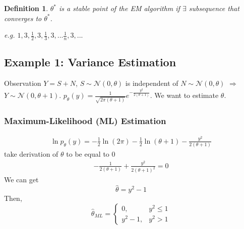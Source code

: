 \documentclass[11pt,a4paper]{article}
\newtheorem{definition}{Definition}
\begin{document}
\begin{definition}
    $\theta^*$ is a stable point of the EM algorithm if $\exists$ subsequence that converges to $\theta^*$.

    e.g. $1,3,\frac{1}{2},3,\frac{1}{3},3,...\frac{1}{n},3,...$
\end{definition}

\subsection{Example 1: Variance Estimation}
Observation $Y=S+N$, $S\sim \mathcal{N}(0,\theta)$ is independent of $N\sim \mathcal{N}(0,\theta)$ $\Rightarrow$ $Y\sim \mathcal{N}(0,\theta+1)$. $p_\theta(y)=\frac{1}{\sqrt{2\pi(\theta+1)}}e^{-\frac{y^2}{2(\theta+1)}}$. We want to estimate $\theta$.
\subsubsection{Maximum-Likelihood (ML) Estimation}
\begin{equation}
    \begin{aligned}
        \ln p_\theta(y)=-\frac{1}{2}\ln (2\pi)-\frac{1}{2}\ln(\theta+1)-\frac{y^2}{2(\theta+1)}
    \end{aligned}
    \nonumber
\end{equation}
take derivation of $\theta$ to be equal to $0$
\begin{equation}
    \begin{aligned}
        -\frac{1}{2(\theta+1)}+\frac{y^2}{2(\theta+1)^2}=0
    \end{aligned}
    \nonumber
\end{equation}
We can get $$\hat{\theta}=y^2-1$$
Then, $$\hat{\theta}_{ML}=\left\{\begin{matrix}
    0,&y^2\leq 1\\
    y^2-1,&y^2>1
\end{matrix}\right.$$
\end{document}
